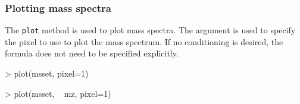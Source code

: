 \documentclass[a4paper]{article}
\begin{document}
\subsubsection{Plotting mass spectra}

The \verb|plot| method is used to plot mass spectra. The  argument is used to specify the pixel to use to plot the mass spectrum. If no conditioning is desired, the formula does not need to be specified explicitly.
\begin{Schunk}
\begin{Sinput}
> plot(msset, pixel=1)
\end{Sinput}
\end{Schunk}
\begin{Schunk}
\begin{Sinput}
> plot(msset, ~ mz, pixel=1)
\end{Sinput}
\end{Schunk}
\end{document}
